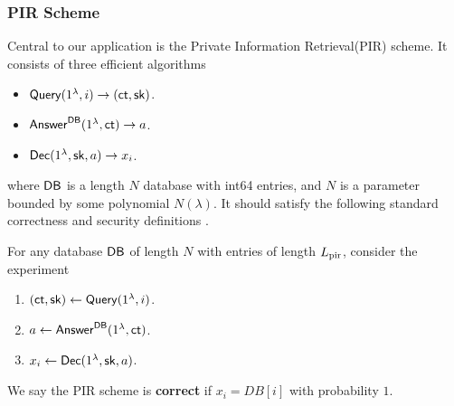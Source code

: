 \subsubsection{PIR Scheme}
\label{subsec:PIR}
Central to our application is the Private Information Retrieval(PIR) scheme. It consists of three efficient algorithms
\begin{itemize}
    \item $\mathsf{Query}(1^{\lambda}, i) \to (\mathsf{ct}, {\mathsf{sk}})$.
    \item $\mathsf{Answer}^{\mathsf{DB}}(1^{\lambda}, \mathsf{ct}) \to a$.
    \item $\mathsf{Dec}(1^{\lambda}, {\mathsf{sk}}, a) \to x_i$.
\end{itemize}
where $\mathsf{DB}$ is a length $N$ database with int64 entries, and $N$ is a parameter bounded by some polynomial $N(\lambda)$. It should satisfy the following standard correctness and security definitions \cite{kushilevitz1997replication}.
\begin{definition}
\label{defn:PIR-correctness}
For any database $\mathsf{DB}$ of length $N$ with entries of length $L_{\text{pir}}$, consider the experiment
\begin{enumerate}
    \item $(\mathsf{ct}, {\mathsf{sk}}) \leftarrow \mathsf{Query}(1^{\lambda}, i)$.
    \item $a \leftarrow \mathsf{Answer}^{\mathsf{DB}}(1^{\lambda}, \mathsf{ct})$.
    \item $x_i \leftarrow \mathsf{Dec}(1^{\lambda}, {\mathsf{sk}}, a)$.
\end{enumerate}
We say the PIR scheme is \textbf{correct} if $x_i = DB[i]$ with probability $1$.
\end{definition}
